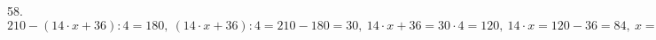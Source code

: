 58. $210-(14\cdot x+36):4=180,\ (14\cdot x+36):4=210-180=30,\ 14\cdot x+36=30\cdot4=120,\ 14\cdot x=120-36=84,\ x=84:14=6.$\\
